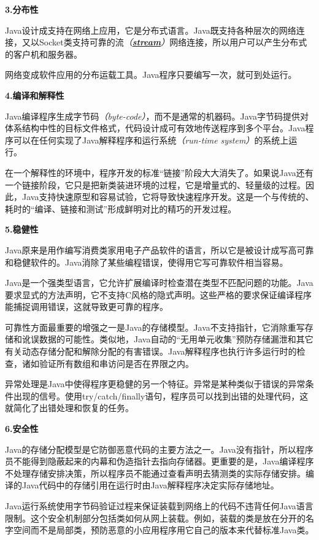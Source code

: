 \documentclass[
]{article}
\begin{document}
\textbf{3.分布性}

Java设计成支持在网络上应用，它是分布式语言。Java既支持各种层次的网络连接，又以Socket类支持可靠的流\emph{（\textbf{\href{https://baike.baidu.com/item/stream}{stream}}）}网络连接，所以用户可以产生分布式的客户机和服务器。

网络变成软件应用的分布运载工具。Java程序只要编写一次，就可到处运行。

\textbf{4.编译和解释性}

Java编译程序生成字节码\emph{（byte-code）}，而不是通常的机器码。Java字节码提供对体系结构中性的目标文件格式，代码设计成可有效地传送程序到多个平台。Java程序可以在任何实现了Java解释程序和运行系统\emph{（run-time
system）}的系统上运行。

在一个解释性的环境中，程序开发的标准``链接''阶段大大消失了。如果说Java还有一个链接阶段，它只是把新类装进环境的过程，它是增量式的、轻量级的过程。因此，Java支持快速原型和容易试验，它将导致快速程序开发。这是一个与传统的、耗时的``编译、链接和测试''形成鲜明对比的精巧的开发过程。

\textbf{5.稳健性}

Java原来是用作编写消费类家用电子产品软件的语言，所以它是被设计成写高可靠和稳健软件的。Java消除了某些编程错误，使得用它写可靠软件相当容易。

Java是一个强类型语言，它允许扩展编译时检查潜在类型不匹配问题的功能。Java要求显式的方法声明，它不支持C风格的隐式声明。这些严格的要求保证编译程序能捕捉调用错误，这就导致更可靠的程序。

可靠性方面最重要的增强之一是Java的存储模型。Java不支持指针，它消除重写存储和讹误数据的可能性。类似地，Java自动的``无用单元收集''预防存储漏泄和其它有关动态存储分配和解除分配的有害错误。Java解释程序也执行许多运行时的检查，诸如验证所有数组和串访问是否在界限之内。

异常处理是Java中使得程序更稳健的另一个特征。异常是某种类似于错误的异常条件出现的信号。使用try/catch/finally语句，程序员可以找到出错的处理代码，这就简化了出错处理和恢复的任务。

\textbf{6.安全性}

Java的存储分配模型是它防御恶意代码的主要方法之一。Java没有指针，所以程序员不能得到隐蔽起来的内幕和伪造指针去指向存储器。更重要的是，Java编译程序不处理存储安排决策，所以程序员不能通过查看声明去猜测类的实际存储安排。编译的Java代码中的存储引用在运行时由Java解释程序决定实际存储地址。

Java运行系统使用字节码验证过程来保证装载到网络上的代码不违背任何Java语言限制。这个安全机制部分包括类如何从网上装载。例如，装载的类是放在分开的名字空间而不是局部类，预防恶意的小应用程序用它自己的版本来代替标准Java类。
\end{document}
